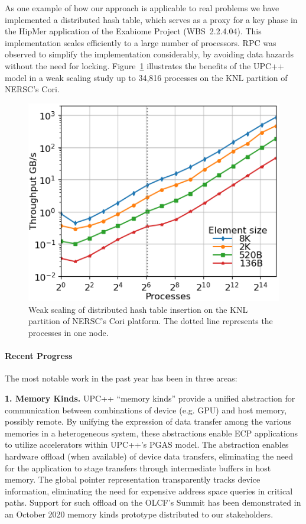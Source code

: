 As one example of how our approach is applicable to real problems
we have implemented a distributed hash table, which serves as a proxy
for a key phase in the HipMer application of the Exabiome Project (WBS~2.2.4.04).
This implementation scales efficiently
to a large number of processors. RPC was observed to simplify the implementation
considerably, by avoiding data hazards without the need for locking.
Figure~\ref{fig:dht} illustrates the benefits of the UPC++ model 
in a weak scaling study up to 34,816 processes on the KNL partition of NERSC's Cori.


\begin{figure}[htb]
\centering
      \includegraphics[scale=0.70]{projects/2.3.1-PMR/2.3.1.14-UPCxx-GASNet/all-cori-knl-out-inserts-wait.png}
  \caption{Weak scaling of distributed hash table insertion on the KNL partition of NERSC's Cori platform. The dotted line represents the processes in one node.}
  \label{fig:dht}
\end{figure}



\paragraph{Recent Progress}

The most notable work in the past year has been in three areas:

\textbf{1. Memory Kinds.}
UPC++ ``memory kinds'' provide a unified abstraction for communication between
combinations of device (e.g. GPU) and host memory, possibly remote.  By
unifying the expression of data transfer among the various memories in a
heterogeneous system, these abstractions enable ECP
applications to utilize accelerators within UPC++'s PGAS model.  The
abstraction enables hardware offload (when available) of device data transfers,
eliminating the need for the application to stage transfers through
intermediate buffers in host memory.
The global pointer representation transparently tracks device information,
eliminating the need for expensive address space queries in critical paths.
Support for such offload on the OLCF's
Summit has been demonstrated in an October 2020 memory kinds prototype
distributed to our stakeholders.

